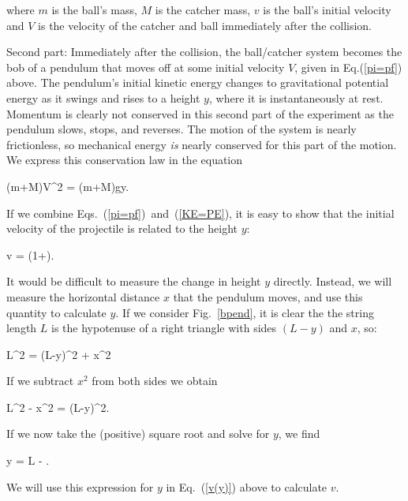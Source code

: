 where $m$ is the ball's mass, $M$ is the catcher mass, $v$ is the
ball's initial velocity and $V$ is the velocity of the catcher and
ball immediately after the collision.

Second part:  Immediately after the collision, the ball/catcher system
becomes the bob of a pendulum that moves off at some initial velocity
$V$, given in Eq.(\ref{pi=pf}) above. The pendulum's initial
kinetic energy changes to gravitational
potential energy as it swings and rises to a height $y$, where it is
instantaneously at rest. Momentum is clearly not
conserved in this second part of the experiment as the
pendulum slows, stops, and reverses. The motion
of the system is nearly frictionless, so mechanical energy {\it is} nearly
conserved for this part of the motion.  We express this conservation
law in the equation

\beq
{}(m+M)V^{2} = (m+M)gy. \label{KE=PE}
\eeq

If we combine Eqs.~(\ref{pi=pf})~and~(\ref{KE=PE}), it is easy to
show that the initial velocity of the projectile is related to the
height $y$:

\beq
v = \left(1+\right). \label{v(y)}
\eeq

It would be difficult to measure the change in height $y$ directly.
Instead, we will measure the horizontal distance $x$ that the pendulum
moves, and use this quantity to calculate $y$.  If we consider
Fig.~\ref{bpend}, it is clear the the string length $L$ is
the hypotenuse of a right triangle with sides $(L-y)$ and $x$, so:


\beq
L^2 = (L-y)^2 + x^2
\eeq

If we subtract $x^2$ from both sides we obtain

\beq
L^2 - x^2 = (L-y)^2.
\eeq

If we now take the (positive) square root and solve for $y$,
we find

\beq
y = L - . \label{y(xL)}
\eeq

We will use this expression for $y$ in Eq.~(\ref{v(y)}) above to
calculate $v$.

